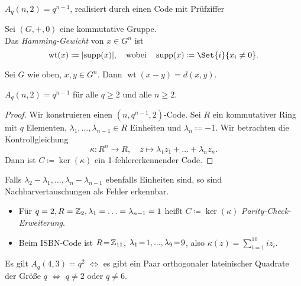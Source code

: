 \documentclass{cheat-sheet}
\DeclareMathOperator{\wt}{wt} %
\begin{document}
\begin{satz}
  $A_q(n, 2) = q^{n-1}$, realisiert durch einen Code mit Prüfziffer
\end{satz}


% 
\begin{defn}
  Sei $(G, +, 0)$ eine kommutative Gruppe. \\
  Das \emph{Hamming-Gewicht} von $x \in G^n$ ist
  \[
    \wt(x) \coloneqq \abs{\supp(x)},
    \quad \text{wobei} \quad
    \supp(x) \coloneqq \Set{i}{x_i \neq 0}.
  \]
\end{defn}

\begin{lem}
  Sei $G$ wie oben, $x, y \in G^n$.
  Dann $\wt(x-y) = d(x, y)$.
\end{lem}

\begin{satz}
  $A_q(n, 2) = q^{n-1}$ für alle $q \geq 2$ und alle $n \geq 2$.
\end{satz}

\begin{proof}
  Wir konstruieren einen $(n, q^{n-1}, 2)$-Code.
  Sei $R$ ein kommutativer Ring mit $q$ Elementen, $\lambda_1, \ldots, \lambda_{n-1} \in R$ Einheiten und $\lambda_n \coloneqq -1$. Wir betrachten die Kontrollgleichung
  \[
    \kappa : R^n \to R, \quad
    z \mapsto \lambda_1 z_1 + \ldots + \lambda_n z_n.
  \]
  Dann ist $C \coloneqq \ker(\kappa)$ ein 1-fehlererkennender Code.
\end{proof}

\begin{lem}
  Falls $\lambda_2 - \lambda_1, \ldots, \lambda_n - \lambda_{n-1}$ ebenfalls Einheiten sind, so sind Nachbarvertauschungen als Fehler erkennbar.
\end{lem}

\begin{bspe}
  \begin{itemize}
    \item Für $q=2, R=\mathbb{Z}_2, \lambda_1 = \ldots = \lambda_{n-1} = 1$ heißt $C \coloneqq \ker(\kappa)$ \emph{Parity-Check-Erweiterung}.
    \item Beim ISBN-Code ist $R \!=\! \mathbb{Z}_{11}$, $\lambda_1 \!=\! 1, ..., \lambda_9 \!=\! 9$, also $\kappa(z) = \sum_{i=1}^{10} i z_i$.
  \end{itemize}
\end{bspe}

\begin{bem}
  Es gilt $A_q(4,3) = q^2$ $\iff$ es gibt ein Paar orthogonaler lateinischer Quadrate der Größe $q$ $\iff$ $q \neq 2$ oder $q \neq 6$.
\end{bem}
\end{document}
